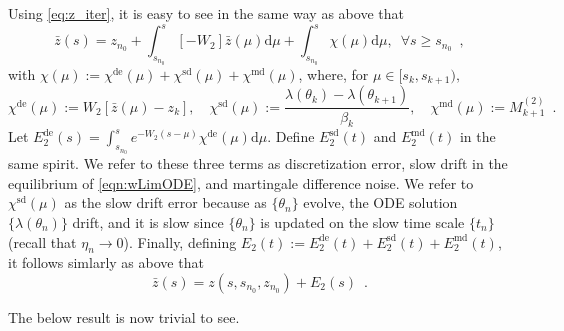\documentclass[usenames,dvipsnames,final,12pt]{colt2018} %
\newcommand{\vop}{VoP}
\newcommand{\bt}{b_1}
\newcommand{\Xt}{X_1}
\newcommand{\bart}{\bar{\theta}}
\newcommand{\Et}{E_1}
\newcommand{\tSol}[1]{\theta(#1, \tI{n_0}, \theta_{n_0})}
\newcommand{\zetD}{\zeta^{\dt}}
\newcommand{\zetM}{\zeta^{\md}}
\newcommand{\zetT}{\zeta^{\te}}
\newcommand{\EtD}{\Et^{\dt}}
\newcommand{\EtM}{\Et^{\md}}
\newcommand{\EtT}{\Et^{\te}}
\newcommand{\Ww}{W_2}
\newcommand{\Mw}{M^{(2)}}
\newcommand{\chizD}{\chi^{\dt}}
\newcommand{\chizM}{\chi^{\md}}
\newcommand{\chizS}{\chi^{\sd}}
\newcommand{\barz}{\bar{z}}
\newcommand{\Ez}{E_2}
\newcommand{\EzD}{\Ez^{\dt}}
\newcommand{\EzM}{\Ez^{\md}}
\newcommand{\EzS}{\Ez^{\sd}}
\newcommand{\zSol}[1]{z(#1, \sI{n_0}, z_{n_0})}
\newcommand{\dt}{\text{de}}
\newcommand{\md}{\text{md}}
\newcommand{\sd}{\text{sd}}
\newcommand{\te}{\text{te}}
\newcommand{\df}{\mathrm{d}}
\newcommand{\tI}[1]{t_{#1}}
\newcommand{\sI}[1]{s_{#1}}
\begin{document}
Using \eqref{eq:z_iter}, it is easy to see in the same way {as above} that
%
\begin{equation}
\label{eqn:zTotUpd}
\barz(s) = z_{n_0} + \int_{\sI{n_0}}^{s} [-\Ww] \barz(\mu) \df \mu + \int_{\sI{n_0}}^{s} \chi(\mu) \df \mu, \enspace \forall s \geq \sI{n_0} \enspace,
\end{equation}
%
with $\chi(\mu) := \chizD(\mu) + \chizS(\mu) + \chizM(\mu)$, where, for $\mu \in [\sI{k}, \sI{k + 1}),$
\begin{equation}
\chizD(\mu) := \Ww[\barz(\mu) - z_k], \quad \chizS(\mu) := \frac{\lambda(\theta_k) - \lambda(\theta_{k + 1})}{\beta_k}, \quad \chizM(\mu) := \Mw_{k+1} \enspace.
\end{equation}
Let $\EzD(s) = \int_{\sI{n_0}}^{s} e^{-\Ww(s - \mu)} \chizD(\mu) \df \mu$.
Define $\EzS(t)$ and $\EzM(t)$ in the same spirit.
%
We refer to these three terms as
discretization error, slow drift in the equilibrium of \eqref{eqn:wLimODE}, and martingale difference noise.
%
We refer to $\chizS(\mu)$ as the slow drift error because as $\{\theta_n\}$ evolve, the ODE solution $\{\lambda(\theta_n)\}$ drift,
and it is slow since $\{\theta_n\}$ is updated on the slow time scale $\{\tI{n}\}$ (recall that $\eta_n \to 0$).
Finally, defining $\Ez(t) := \EzD(t) + \EzS(t) + \EzM(t)$, it follows simlarly as above that
\begin{equation}
%
\barz(s) = \zSol{s} +  \Ez(s) \enspace. \label{eqn:w-TrajComp}
%
\end{equation}

The below result is now trivial to see.
\end{document}
